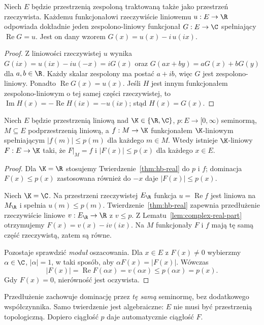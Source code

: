 \begin{lemat}
\label{lem:complex-real-part}
Niech $E$ będzie przestrzenią zespoloną traktowaną także
jako przestrzeń rzeczywista. Każdemu funkcjonałowi
rzeczywiście liniowemu $u:E\to\R$ odpowiada dokładnie
jeden zespolono-liniowy funkcjonał $G:E\to\C$ spełniający
$\operatorname{Re}G=u$. Jest on dany wzorem
$G(x)=u(x)-i\,u(ix)$.
\end{lemat}
\begin{proof}
Z liniowości rzeczywistej $u$ wynika
$G(ix)=u(ix)-i u(-x)=iG(x)$ oraz
$G(ax+by)=aG(x)+bG(y)$ dla $a,b\in\R$.
Każdy skalar zespolony ma postać $a+ib$, więc $G$ jest
zespolono-liniowy. Ponadto $\operatorname{Re}G(x)=u(x)$.
Jeśli $H$ jest innym funkcjonałem zespolono-liniowym
o tej samej części rzeczywistej, to
$\operatorname{Im}H(x)=-\operatorname{Re}H(ix)=-u(ix)$;
stąd $H(x)=G(x)$.
\end{proof}

\begin{twierdzenie}
\label{thm:hb-complex-seminorm}
Niech $E$ będzie przestrzenią liniową nad
$\K\in\{\R,\C\}$, $p:E\to[0,\infty)$ seminormą,
$M\subseteq E$ podprzestrzenią liniową, a
$f:M\to\K$ funkcjonałem $\K$-liniowym spełniającym
$|f(m)|\le p(m)$ dla każdego $m\in M$.
Wtedy istnieje $\K$-liniowy $F:E\to\K$ taki, że
$F|_M=f$ i $|F(x)|\le p(x)$ dla każdego $x\in E$.
\end{twierdzenie}
\begin{proof}
Dla $\K=\R$ stosujemy Twierdzenie~\ref{thm:hb-real}
do $p$ i $f$; dominacja $F(x)\le p(x)$ zastosowana
również do $-x$ daje $|F(x)|\le p(x)$.

Niech $\K=\C$. Na przestrzeni rzeczywistej
$E_{\R}$ funkcja $u=\operatorname{Re}f$ jest liniowa
na $M_{\R}$ i spełnia $u(m)\le p(m)$.
Twierdzenie~\ref{thm:hb-real} zapewnia przedłużenie
rzeczywiście liniowe $v:E_{\R}\to\R$ z $v\le p$.
Z Lematu~\ref{lem:complex-real-part} otrzymujemy
$F(x)=v(x)-iv(ix)$. Na $M$ funkcjonały $F$ i $f$
mają tę samą część rzeczywistą, zatem są równe.

Pozostaje sprawdzić \emph{moduł} oszacowania. Dla
$x\in E$ z $F(x)\ne0$ wybierzmy $\alpha\in\C$,
$|\alpha|=1$, w taki sposób, aby
$\alpha F(x)=|F(x)|$. Wówczas
\[
 |F(x)|=\operatorname{Re}F(\alpha x)
 =v(\alpha x)\le p(\alpha x)=p(x).
\]
Gdy $F(x)=0$, nierówność jest oczywista.
\end{proof}

\begin{uwaga}
Przedłużenie zachowuje dominację przez \emph{tę samą}
seminormę, bez dodatkowego współczynnika. Samo twierdzenie
jest algebraiczne: $E$ nie musi być przestrzenią topologiczną.
Dopiero ciągłość $p$ daje automatycznie ciągłość $F$.
\end{uwaga}

